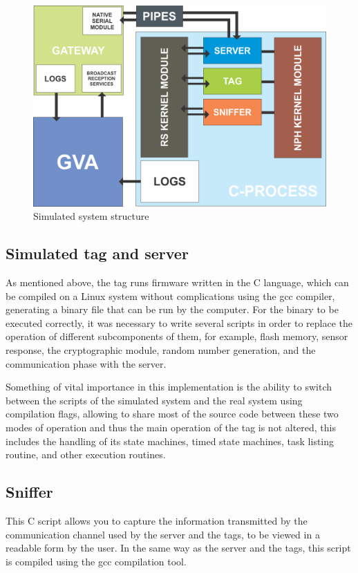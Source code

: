\documentclass[journal]{IEEEtran}	%
\begin{document}
\begin{figure}[H]
\centering
\includegraphics[width=0.95\columnwidth]{SIMULATED-SYSTEM.png}
\caption{Simulated system structure}
\label{fig:simulated-system}
\end{figure}

\subsection{Simulated tag and server}

As mentioned above, the tag runs firmware written in the C language, which can be compiled on a Linux system without complications using the gcc compiler, generating a binary file that can be run by the computer. For the binary to be executed correctly, it was necessary to write several scripts in order to replace the operation of different subcomponents of them, for example, flash memory, sensor response, the cryptographic module, random number generation, and the communication phase with the server.

Something of vital importance in this implementation is the ability to switch between the scripts of the simulated system and the real system using compilation flags, allowing to share most of the source code between these two modes of operation and thus the main operation of the tag is not altered, this includes the handling of its state machines, timed state machines, task listing routine, and other execution routines.

\subsection{Sniffer}

This C script allows you to capture the information transmitted by the communication channel used by the server and the tags, to be viewed in a readable form by the user. In the same way as the server and the tags, this script is compiled using the gcc compilation tool.
\end{document}
